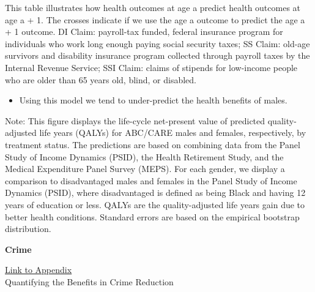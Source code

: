 \documentclass[static]{JJH-Beamer}
\begin{document}
{\flushleft \normalsize This table illustrates how health outcomes at age a predict health outcomes at age a + 1. The crosses indicate if we use the age a outcome to predict the age a + 1 outcome. DI Claim: payroll-tax funded, federal insurance program for individuals who work long enough paying social security taxes; SS Claim: old-age survivors and disability insurance program collected through payroll taxes by the Internal Revenue Service; SSI Claim: claims of stipends for low-income people who are older than 65 years old, blind, or disabled.\\}

\clearpage

\begin{itemize}
\item Using this model we tend to under-predict the health benefits of males.
\end{itemize}

{\flushleft \normalsize Note:  This figure displays the life-cycle net-present value of predicted quality-adjusted life years (QALYs) for ABC/CARE males and females, respectively, by treatment status. The predictions are based on combining data from the Panel Study of Income Dynamics (PSID), the Health Retirement Study, and the Medical Expenditure Panel Survey (MEPS). For each gender, we display a comparison to disadvantaged males and females in the Panel Study of Income Dynamics (PSID), where disadvantaged is defined as being Black and having 12 years of education or less. QALYs are the quality-adjusted life years gain due to better health conditions. Standard errors are based on the empirical bootstrap distribution.\\}
\clearpage
\begin{frame}

\begin{center}
\textbf{Crime}
\end{center}

\end{frame}

\begin{frame}

\hypertarget{ret:muffin}{}
\begin{center}
\hyperlink{muffin}{\underline{Link to Appendix}}\\
Quantifying the Benefits in Crime Reduction
\end{center}

\end{frame}
\end{document}
